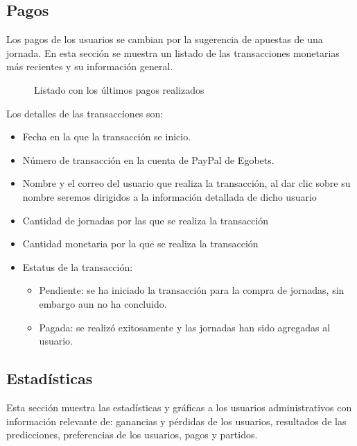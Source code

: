 
\subsection{Pagos}
Los pagos de los usuarios se cambian por la sugerencia de apuestas de una jornada. En esta sección se muestra un listado de las transacciones monetarias más recientes y su información general.

\begin{figure}[!htb]\centering
   \begin {minipage}{1\textwidth}
     \caption{Listado con los últimos pagos realizados}
	 \label{Fig:Transacciones}
   \end{minipage}
\end{figure}

Los detalles de las transacciones son:
\begin{itemize}
	\item Fecha en la que la transacción se inicio.
	\item Número de transacción en la cuenta de PayPal de Egobets.
	\item Nombre y el correo del usuario que realiza la transacción, al dar clic sobre su nombre seremos dirigidos a la información detallada de dicho usuario
	\item Cantidad de jornadas por las que se realiza la transacción
	\item Cantidad monetaria por la que se realiza la transacción
	\item Estatus de la transacción:
	\begin{itemize}
		\item Pendiente: se ha iniciado la transacción para la compra de jornadas, sin embargo aun no ha concluido.
		\item Pagada: se realizó exitosamente y las jornadas han sido agregadas al usuario.
	\end{itemize}
\end{itemize}

\subsection{Estadísticas}

Esta sección muestra las estadísticas y gráficas a los usuarios administrativos con información relevante de: ganancias y pérdidas de los usuarios, resultados de las predicciones, preferencias de los usuarios, pagos y partidos.

